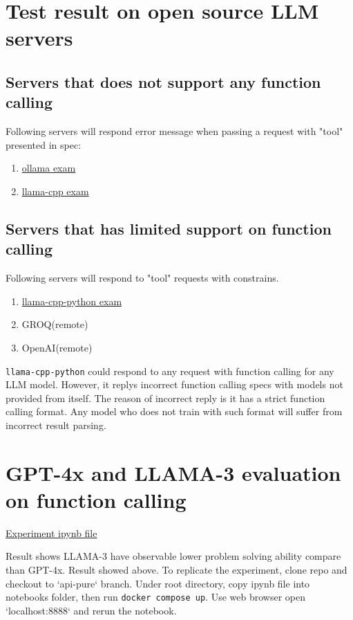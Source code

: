 \section{Test result on open source LLM servers}
\subsection{Servers that does not support any function calling}
Following servers will respond error message when passing a request with "tool" presented in spec:
\begin{enumerate}
  \item \href{https://github.com/kd-research/LLM-fc-servers-review/tree/ollama}{ollama exam}
  \item \href{https://github.com/kd-research/LLM-fc-servers-review/tree/llamacpp}{llama-cpp exam}
\end{enumerate}

\subsection{Servers that has limited support on function calling}
Following servers will respond to "tool" requests with constrains.
\begin{enumerate}
  \item \href{https://github.com/kd-research/LLM-fc-servers-review/tree/llamacpppython}{llama-cpp-python exam}
  \item GROQ(remote)
  \item OpenAI(remote)
\end{enumerate}

\texttt{llama-cpp-python} could respond to any request with function calling for any LLM model. However, it 
replys incorrect function calling specs with models not provided from itself. The reason of incorrect reply is it has a 
strict function calling format. Any model who does not train with such format will suffer from incorrect result parsing.

\section{GPT-4x and LLAMA-3 evaluation on function calling}
\href{https://github.com/kd-research/LLM-fc-servers-review/blob/370d0e6414019c4c4bc7ed4764f1f295d4c3590b/compare-openai-groq-llama3-performance.ipynb}{Experiment 
ipynb file}

Result shows LLAMA-3 have observable lower problem solving ability compare than GPT-4x. Result showed above. To 
replicate the experiment, clone repo and checkout to `api-pure` branch. Under root directory, copy ipynb file into 
notebooks folder, then run \texttt{docker compose up}. Use web browser open `localhost:8888` and rerun the 
notebook.

